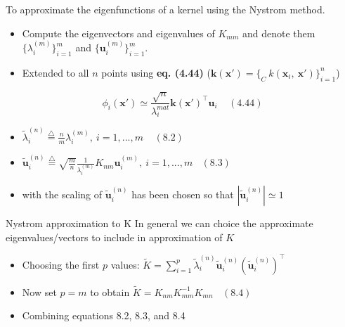 \documentclass[
  ignorenonframetext,
]{beamer}
\providecommand{\tightlist}{%
  \setlength{\itemsep}{0pt}\setlength{\parskip}{0pt}}
\begin{document}
\begin{frame}{To approximate the eigenfunctions of a kernel using the
Nystrom method.}
\protect\hypertarget{to-approximate-the-eigenfunctions-of-a-kernel-using-the-nystrom-method.}{}
\begin{itemize}
\item
  Compute the eigenvectors and eigenvalues of \(K_{mm}\) and denote them
  \(\{{\lambda}_i^{(m)}\}^m_{i=1}\) and \(\{\pmb u_i^{(m)}\}^m_{i=1}\).
\item
  Extended to all \(n\) points using \textbf{eq. (4.44)}
  (\(\pmb k(\pmb x') = \{_C\ k(\pmb x_i,\ \pmb x') \}_{i=1}^n\))
\end{itemize}

\[
\phi_i(\pmb x') \simeq \frac {\sqrt n } {\lambda_i^{mat}} \pmb k(\pmb x')^{\top}\pmb u_i \ \ \ \ \ (4.44)
\]

\begin{itemize}
\tightlist
\item
  \({\tilde \lambda}^{(n)}_i \stackrel {\bigtriangleup} = \frac n m {\lambda}^{(m)}_i,\  i = 1, . . . , m \ \ \ \ \ (8.2)\)
\item
  \(\pmb {\tilde u}^{(n)}_i \stackrel {\bigtriangleup} = \sqrt {\frac m n} \frac 1 {{\lambda}^{(m)}_i} K_{nm} \pmb u_i^{(m)},\  i = 1, . . . , m \ \ \ \ (8.3)\)
\item
  with the scaling of \(\pmb {\tilde u}_i^{(n)}\) has been chosen so
  that \(|\pmb {\tilde u}_i^{(n)}| \simeq 1\)
\end{itemize}
\end{frame}

\begin{frame}{Nystrom approximation to K}
\protect\hypertarget{nystrom-approximation-to-k}{}
In general we can choice the approximate eigenvalues/vectors to include
in approximation of \(K\)

\begin{itemize}
\item
  Choosing the first \(p\) values:
  \({ \tilde K} = \sum^p_{i=1} {\tilde \lambda}_i^{(n)} \pmb {\tilde u}^{(n)}_i (\pmb {\tilde u}^{(n)}_i)^{\top}\)
\item
  Now set \(p = m\) to obtain
  \({ \tilde K} = K_{nm} K_{mm}^{-1} K_{mn} \ \ \ \  (8.4)\)
\item
  Combining equations 8.2, 8.3, and 8.4
\end{itemize}
\end{frame}
\end{document}
